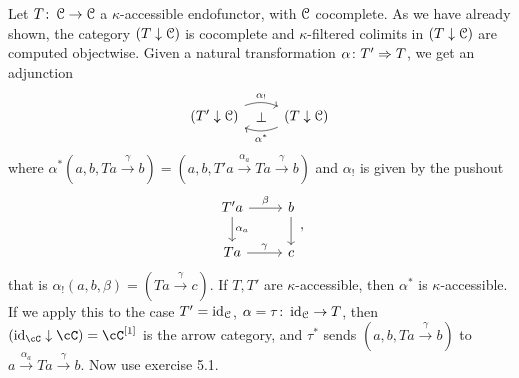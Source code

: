 \documentclass[a4paper,11pt,oneside,openany]{scrbook}
\begin{document}
Let $ T\colon \operatorname{\mathcal{C}} \to \operatorname{\mathcal{C}} $ a $ \kappa $-accessible endofunctor, with $ \operatorname{\mathcal{C}} $ cocomplete.
As we have already shown, the category $ (T \downarrow \operatorname{\mathcal{C}} )$ is cocomplete and $
\kappa $-filtered colimits in $ (T\downarrow\operatorname{\mathcal{C}}) $ are computed objectwise.
Given a natural transformation $ \alpha \colon T' \Rightarrow T $, we get an adjunction
\begin{displaymath}
	\begin{tikzcd}
		(T' \downarrow \C) \arrow[r, "\alpha_!", bend left=20]
		\arrow[from=r, "\alpha^*", bend left=20]
		\arrow[r, phantom, "\bot"]
		& (T \downarrow \C)
	\end{tikzcd}
\end{displaymath}
where $\alpha^*(a,b,Ta\xrightarrow{\gamma}b)=(a,b,T'a\xrightarrow{\alpha_a}Ta\xrightarrow{\gamma}b)$
and $\alpha_!$ is given by the pushout
\begin{displaymath}
	\begin{tikzcd}
		T'a \arrow[r,"\beta"]\arrow[d,"\alpha_a"]& b\arrow[d]\\
		Ta \arrow[r, "\gamma"] & c
	\end{tikzcd},
\end{displaymath}
that is $\alpha_!(a,b,\beta)= (Ta\xrightarrow{\gamma} c)$.
If $ T,T' $ are $ \kappa $-accessible, then $ \alpha ^* $ is $ \kappa $-accessible.
If we apply this to the case $ T' = \operatorname{id}_{\operatorname{\mathcal{C}}} $, $ \alpha=\tau\colon \operatorname{id}_{\operatorname{\mathcal{C}}} \to
T$, then $(\id_\cC\downarrow\cC)=\cC ^{[1]}$ is the arrow category, and
$ \tau^* $ sends $ (a,b,Ta \xrightarrow{\gamma}b) $ to $ a
\xrightarrow{\alpha_a} Ta \xrightarrow{\gamma} b $.
Now use exercise 5.1.
\end{document}
